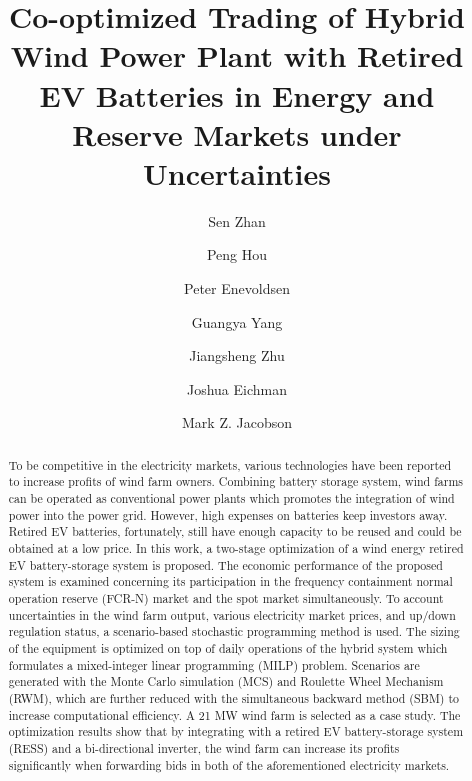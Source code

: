 \documentclass[final,5p,times,twocolumn,authoryear]{elsarticle}
\begin{document}
\begin{frontmatter}

\title{Co-optimized Trading of Hybrid Wind Power Plant with Retired EV Batteries in Energy and Reserve Markets under Uncertainties}



\author[add1]{Sen Zhan} 
\author[add2]{Peng Hou} 
\author[add3]{Peter Enevoldsen} 
\author[add1]{Guangya Yang} 
\author[add2]{Jiangsheng Zhu} 
\author[add4]{Joshua Eichman} 
\author[add5]{Mark Z. Jacobson} 

\address[add1]{Center of Electrical Engineering, Technical University of Denmark, Denmark}
\address[add2]{SEWPG European Innovation Center, Denmark}
\address[add3]{Centre for Energy Technologies, Aarhus University, Denmark}
\address[add4]{National Renewable Energy Laboratory, USA}
\address[add5]{Department of Civil and Environmental Engineering, Stanford University, USA}




\begin{abstract}
To be competitive in the electricity markets, various technologies have been reported to increase profits of wind farm owners. Combining battery storage system, wind farms can be operated as conventional power plants which promotes the integration of wind power into the power grid. However, high expenses on batteries keep investors away. Retired EV batteries, fortunately,  still have enough capacity to be reused and could be obtained at a low price. In this work, a two-stage optimization of a wind energy retired EV battery-storage system is proposed. The economic performance of the proposed system is examined concerning its participation in the frequency containment normal operation reserve (FCR-N) market and the spot market simultaneously. To account uncertainties in the wind farm output, various electricity market prices, and up/down regulation status, a scenario-based stochastic programming method is used. The sizing of the equipment is optimized on top of daily operations of the hybrid system which formulates a mixed-integer linear programming (MILP) problem. Scenarios are generated with the Monte Carlo simulation (MCS) and Roulette Wheel Mechanism (RWM), which are further reduced with the simultaneous backward method (SBM) to increase computational efficiency. A 21 MW wind farm is selected as a case study. The optimization results show that by integrating with a retired EV battery-storage system (RESS) and a bi-directional inverter, the wind farm can increase its profits significantly when forwarding bids in both of the aforementioned electricity markets.


\end{abstract}
\end{frontmatter}
\end{document}
